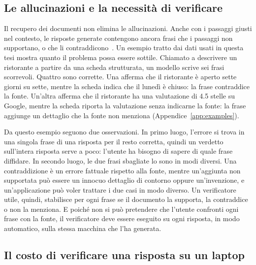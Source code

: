 \subsection{Le allucinazioni e la necessità di verificare}
\label{sec:intro-hallucination}

Il recupero dei documenti non elimina le allucinazioni. Anche con i passaggi giusti nel contesto, le risposte generate
contengono ancora frasi che i passaggi non supportano, o che li contraddicono~\cite{niu2024ragtruth,huang2025hallucination}.
Un esempio tratto dai dati usati in questa tesi mostra quanto il problema possa essere sottile. Chiamato a descrivere un
ristorante a partire da una scheda strutturata, un modello scrive sei frasi scorrevoli. Quattro sono corrette. Una
afferma che il ristorante è aperto sette giorni su sette, mentre la scheda indica che il lunedì è chiuso: la frase
contraddice la fonte. Un'altra afferma che il ristorante ha una valutazione di 4.5 stelle su Google, mentre la scheda
riporta la valutazione senza indicarne la fonte: la frase aggiunge un dettaglio che la fonte non menziona
(Appendice~\ref{app:examples}).

Da questo esempio seguono due osservazioni. In primo luogo, l'errore si trova in una singola frase di una risposta per il
resto corretta, quindi un verdetto sull'intera risposta serve a poco: l'utente ha bisogno di sapere di quale frase
diffidare. In secondo luogo, le due frasi sbagliate lo sono in modi diversi. Una contraddizione è un errore fattuale
rispetto alla fonte, mentre un'aggiunta non supportata può essere un innocuo dettaglio di contorno oppure un'invenzione,
e un'applicazione può voler trattare i due casi in modo diverso. Un verificatore utile, quindi, stabilisce per ogni frase
se il documento la supporta, la contraddice o non la menziona. E poiché non si può pretendere che l'utente confronti ogni
frase con la fonte, il verificatore deve essere eseguito su ogni risposta, in modo automatico, sulla stessa macchina che
l'ha generata.

\subsection{Il costo di verificare una risposta su un laptop}
\label{sec:intro-cost}

